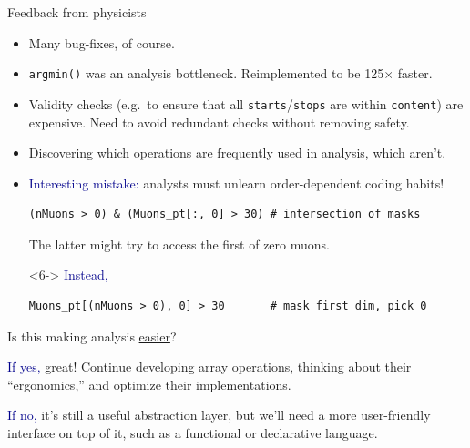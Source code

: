 \documentclass[aspectratio=169]{beamer}
\begin{document}
\begin{frame}[fragile]{Feedback from physicists}
\vspace{0.5 cm}\large
\begin{itemize}\setlength{\itemsep}{0.3 cm}
\item<1-> Many bug-fixes, of course.
\item<2-> {\tt\small argmin()} was an analysis bottleneck. Reimplemented to be 125$\times$ faster.
\item<3-> Validity checks (e.g.\ to ensure that all {\tt \small starts}/{\tt \small stops} are within {\tt \small content}) are expensive. Need to avoid redundant checks without removing safety.
\item<4-> Discovering which operations are frequently used in analysis, which aren't.
\item<5-> \textcolor{darkblue}{Interesting mistake:} analysts must unlearn order-dependent coding habits!

\small\begin{verbatim}
(nMuons > 0) & (Muons_pt[:, 0] > 30) # intersection of masks
\end{verbatim}
\large

The latter might try to access the first of zero muons.

\vspace{0.25 cm}
\begin{uncoverenv}<6->
\textcolor{darkblue}{Instead,}

\small\begin{verbatim}
Muons_pt[(nMuons > 0), 0] > 30       # mask first dim, pick 0
\end{verbatim}
\end{uncoverenv}
\end{itemize}
\end{frame}

\begin{frame}{Is this making analysis \underline{easier}?}
\vspace{0.5 cm}
\Large

\begin{center}
\begin{minipage}{0.8\linewidth}
\textcolor{darkblue}{If yes,} great! Continue developing array operations, thinking about their ``ergonomics,'' and optimize their implementations.

\vspace{0.75 cm}
\textcolor{darkblue}{If no,} it's still a useful abstraction layer, but we'll need a more user-friendly interface on top of it, such as a functional or declarative language.
\end{minipage}
\end{center}
\end{frame}
\end{document}
